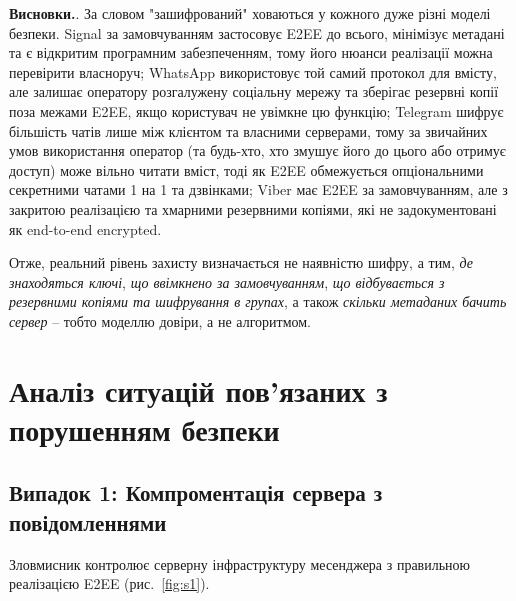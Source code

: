 \textbf{Висновки.}. За словом "зашифрований"{} ховаються у кожного дуже різні моделі безпеки. Signal за замовчуванням 
застосовує E2EE до всього, мінімізує метадані та є відкритим програмним забезпеченням, тому його нюанси реалізації 
можна перевірити власноруч; WhatsApp використовує той самий протокол для вмісту, але залишає оператору розгалужену 
соціальну мережу та зберігає резервні копії поза межами E2EE, якщо користувач не увімкне цю функцію; Telegram шифрує 
більшість чатів лише між клієнтом та власними серверами, тому за звичайних умов використання оператор (та будь-хто, 
хто змушує його до цього або отримує доступ) може вільно читати вміст, тоді як E2EE обмежується опціональними 
секретними чатами 1 на 1 та дзвінками; Viber має E2EE за замовчуванням, але з закритою реалізацією та хмарними 
резервними копіями, які не задокументовані як end-to-end encrypted. 

\indent Отже, реальний рівень захисту визначається не наявністю шифру, а тим, \emph{де знаходяться ключі}, \emph{що ввімкнено 
за замовчуванням}, \emph{що відбувається з резервними копіями та шифрування в групах}, а також \emph{скільки метаданих бачить 
сервер} -- тобто моделлю довіри, а не алгоритмом.

\section{Аналіз ситуацій пов'язаних з порушенням безпеки}
\label{sec:situations}

\subsection{Випадок 1: Компроментація сервера з повідомленнями}
\label{sec:s1}

Зловмисник контролює серверну інфраструктуру месенджера з правильною реалізацією E2EE (рис.~\ref{fig:s1}).

